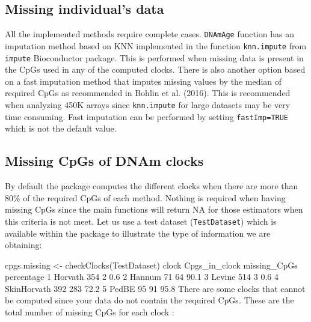 \documentclass[]{article}
\newcommand{\hlnum}[1]{\textcolor[rgb]{0.816,0.125,0.439}{#1}}%
\newcommand{\hlstr}[1]{\textcolor[rgb]{0.251,0.627,0.251}{#1}}%
\newcommand{\hlopt}[1]{\textcolor[rgb]{0,0,0}{#1}}%
\newcommand{\hlstd}[1]{\textcolor[rgb]{0.251,0.251,0.251}{#1}}%
\newcommand{\hlkwd}[1]{\textcolor[rgb]{0.878,0.439,0.125}{#1}}%
\newenvironment{Shaded}{\begin{myshaded}}{\end{myshaded}}
\newcommand{\KeywordTok}[1]{\hlkwd{#1}}
\newcommand{\DecValTok}[1]{\hlnum{#1}}
\newcommand{\FloatTok}[1]{\hlnum{#1}}
\newcommand{\StringTok}[1]{\hlstr{#1}}
\newcommand{\ControlFlowTok}[1]{\hlkwd{#1}}
\newcommand{\OperatorTok}[1]{\hlopt{#1}}
\newcommand{\NormalTok}[1]{\hlstd{#1}}
\begin{document}
\hypertarget{missing-individuals-data}{%
\subsection{Missing individual's data}\label{missing-individuals-data}}

All the implemented methods require complete cases. \texttt{DNAmAge} function has an imputation method based on KNN implemented in the function \texttt{knn.impute} from \texttt{impute} Bioconductor package. This is performed when missing data is present in the CpGs used in any of the computed clocks. There is also another option based on a fast imputation method that imputes missing values by the median of required CpGs as recommended in Bohlin et al. (2016). This is recommended when analyzing 450K arrays since \texttt{knn.impute} for large datasets may be very time consuming. Fast imputation can be performed by setting \texttt{fastImp=TRUE} which is not the default value.

\hypertarget{missing-cpgs-of-dnam-clocks}{%
\subsection{Missing CpGs of DNAm clocks}\label{missing-cpgs-of-dnam-clocks}}

By default the package computes the different clocks when there are more than 80\% of the required CpGs of each method. Nothing is required when having missing CpGs since the main functions will return NA for those estimators when this criteria is not meet. Let us use a test dataset (\texttt{TestDataset}) which is available within the package to illustrate the type of information we are obtaining:

\begin{Shaded}
\begin{Highlighting}[]
\NormalTok{cpgs.missing <-}\StringTok{ }\KeywordTok{checkClocks}\NormalTok{(TestDataset)}
\NormalTok{          clock Cpgs_in_clock missing_CpGs percentage}
  \DecValTok{1}\NormalTok{     Horvath           }\DecValTok{354}            \DecValTok{2}        \FloatTok{0.6}
  \DecValTok{2}\NormalTok{      Hannum            }\DecValTok{71}           \DecValTok{64}       \FloatTok{90.1}
  \DecValTok{3}\NormalTok{      Levine           }\DecValTok{514}            \DecValTok{3}        \FloatTok{0.6}
  \DecValTok{4}\NormalTok{ SkinHorvath           }\DecValTok{392}          \DecValTok{283}       \FloatTok{72.2}
  \DecValTok{5}\NormalTok{       PedBE            }\DecValTok{95}           \DecValTok{91}       \FloatTok{95.8}
\NormalTok{  There are some clocks that cannot be computed since your data do not contain the required CpGs. }
\NormalTok{          These are the total number of missing CpGs }\ControlFlowTok{for}\NormalTok{ each clock }\OperatorTok{:}\StringTok{ }
\StringTok{  }
\end{Highlighting}
\end{Shaded}
\end{document}
